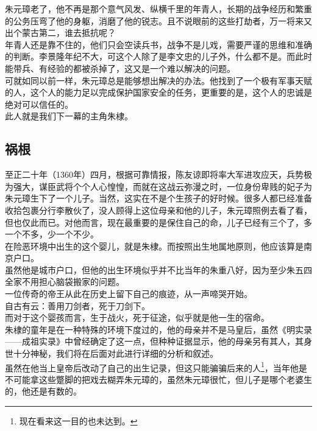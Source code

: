 \begin{multicols}{\theparacolNo}
朱元璋老了，他不再是那个意气风发、纵横千里的年青人，长期的战争经历和繁重的公务压弯了他的身躯，消磨了他的锐志。且不说眼前的这些打劫者，万一将来又出个蒙古第二，谁去抵抗呢？\\

年青人还是靠不住的，他们只会空读兵书，战争不是儿戏，需要严谨的思维和准确的判断。李景隆年纪不大，可这个人除了是李文忠的儿子外，什么都不是。而此时能带兵、有经验的都被杀掉了，这又是一个难以解决的问题。\\

可就如同以前一样，朱元璋总是能够想出解决的办法。他找到了一个极有军事天赋的人，这个人的能力足以完成保护国家安全的任务，更重要的是，这个人的忠诚是绝对可以信任的。\\

此人就是我们下一幕的主角朱棣。\\

\subsection{祸根}
至正二十年（1360年）四月，根据可靠情报，陈友谅即将率大军进攻应天，兵势极为强大，谋臣武将个个人心惶惶，而就在这战云弥漫之时，一位身份卑贱的妃子为朱元璋生下了一个儿子。当然，这实在不是个生孩子的好时候。很多人都已经准备收拾包裹分行李散伙了，没人顾得上这位母亲和他的儿子，朱元璋照例去看了看，但也仅此而已。对他而言，现在最重要的是保住自己的命，儿子已经有三个了，多一个不多，少一个不少。\\

在险恶环境中出生的这个婴儿，就是朱棣。而按照出生地属地原则，他应该算是南京户口。\\

虽然他是城市户口，但他的出生环境似乎并不比当年的朱重八好，因为至少朱五四全家不用担心脑袋搬家的问题。\\

一位传奇的帝王从此在历史上留下自己的痕迹，从一声啼哭开始。\\

自古有云：善用刀剑者，死于刀剑下。\\

而对于这个婴孩而言，生于战火，死于征途，似乎就是他一生的宿命。\\

朱棣的童年是在一种特殊的环境下度过的，他的母亲并不是马皇后，虽然《明实录——成祖实录》中曾经确定了这一点，但种种证据显示，他的母亲另有其人，其身世十分神秘，我们将在后面对此进行详细的分析和叙述。\\

虽然在他当上皇帝后改动了自己的出生记录，但这只能骗骗后来的人\footnote{现在看来这一目的也未达到。}，当年他是不可能拿这些蹩脚的把戏去糊弄朱元璋的，虽然朱元璋很忙，但儿子是哪个老婆生的，他还是有数的。\\


\end{multicols}
